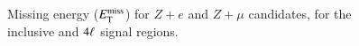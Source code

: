 \begin{figure}[htb]
{  }
   \\
  \caption{Missing energy ($E_{\text{T}}^{\text{miss}}$) for $Z+e$ and $Z+\mu$ candidates, for the inclusive and $4\ell$ signal regions.}
  \label{fig:SR-ETMiss-1}
\end{figure}

\clearpage

